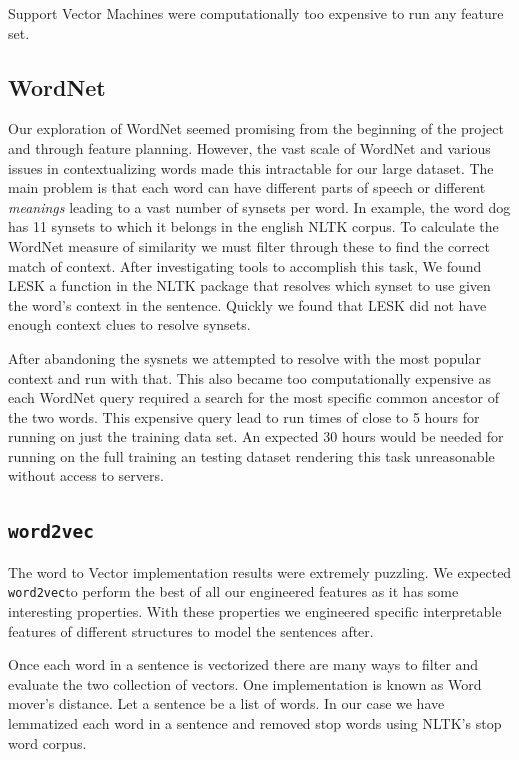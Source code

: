 \documentclass{article} %
\newcommand{\wordtvec}{\texttt{word2vec}}
\begin{document}
Support Vector Machines were computationally too expensive to run any feature set.

\subsection{WordNet} \label{sub:wnet_res}
Our exploration of WordNet seemed promising from the beginning of the project and through feature planning. However, the vast scale of WordNet and various issues in contextualizing words made this intractable for our large dataset. The main problem is that each word can have different parts of speech or different \textit{meanings} leading to a vast number of synsets per word. In example, the word dog has 11 synsets to which it belongs in the english NLTK corpus. To calculate the WordNet measure of similarity we must filter through these to find the correct match of context. After investigating tools to accomplish this task, We found LESK a function in the NLTK package that resolves which synset to use given the word's context in the sentence. Quickly we found that LESK did not have enough context clues to resolve synsets.

After abandoning the sysnets we attempted to resolve with the most popular context and run with that. This also became too computationally expensive as each WordNet query required a search for the most specific common ancestor of the two words. This expensive query lead to run times of close to 5 hours for running on just the training data set. An expected 30 hours would be needed for running on the full training an testing dataset rendering this task unreasonable without access to servers.

\subsection{\wordtvec}
The word to Vector implementation results were extremely puzzling. We expected \wordtvec to perform the best of all our engineered features as it has some interesting properties. With these properties we engineered specific interpretable features of different structures to model the sentences after.

Once each word in a sentence is vectorized there are many ways to filter and evaluate the two collection of vectors. One implementation is known as Word mover's distance. Let a sentence be a list of words. In our case we have lemmatized each word in a sentence and removed stop words using NLTK's stop word corpus. 
\end{document}
